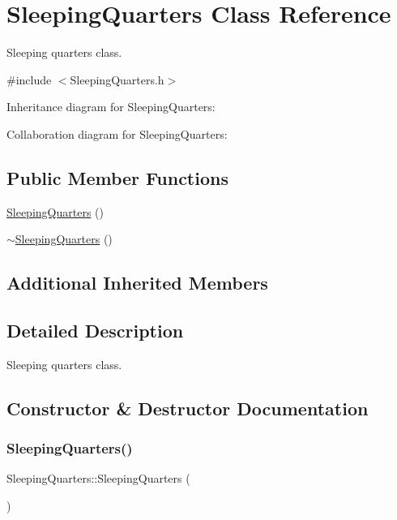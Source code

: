 \hypertarget{classSleepingQuarters}{}\section{Sleeping\+Quarters Class Reference}
\label{classSleepingQuarters}


Sleeping quarters class.  




{\ttfamily \#include $<$Sleeping\+Quarters.\+h$>$}



Inheritance diagram for Sleeping\+Quarters\+:


Collaboration diagram for Sleeping\+Quarters\+:
\subsection*{Public Member Functions}
\begin{DoxyCompactItemize}
\item 
\hyperlink{classSleepingQuarters_ab4055fa9d6ac27506b1577faec404fbb}{Sleeping\+Quarters} ()
\item 
\hyperlink{classSleepingQuarters_ad32e286540e322186993b15f5ebcffbc}{$\sim$\+Sleeping\+Quarters} ()
\end{DoxyCompactItemize}
\subsection*{Additional Inherited Members}


\subsection{Detailed Description}
Sleeping quarters class. 

\subsection{Constructor \& Destructor Documentation}
\mbox{\label{classSleepingQuarters_ab4055fa9d6ac27506b1577faec404fbb}} 
\subsubsection{\texorpdfstring{Sleeping\+Quarters()}{SleepingQuarters()}}
{\footnotesize\ttfamily Sleeping\+Quarters\+::\+Sleeping\+Quarters (\begin{DoxyParamCaption}{ }\end{DoxyParamCaption})}

